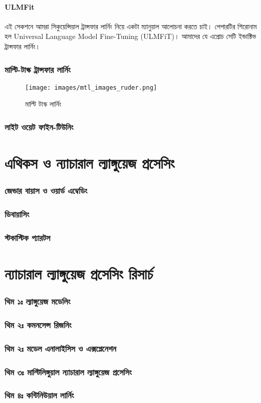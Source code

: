 \documentclass{book}
\begin{document}
\subsubsection{ULMFit} 
এই সেকশনে আমরা সিকুয়েন্সিয়াল ট্রান্সফার লার্নিং নিয়ে একটা ম্যানুয়াল আলোচনা করতে চাই। পেপারটির শিরোনাম হল Universal Language Model Fine-Tuning (ULMFiT)। আমাদের যে এপ্রোচ সেটি ইন্ডাক্টিভ ট্রান্সফার লার্নিং। 



\subsection{মাল্টি-টাস্ক ট্রান্সফার লার্নিং}

\begin{figure}[htbp] %
   \centering
   \texttt{[image: images/mtl\_images\_ruder.png]} 
   \caption{মাল্টি টাস্ক লার্নিং}
   \label{fig:ruder_mtl}
\end{figure} 
\subsection{লাইট ওয়েট ফাইন-টিউনিং}

\chapter{এথিকস ও ন্যাচারাল ল্যাঙ্গুয়েজ প্রসেসিং}
\subsection{জেন্ডার বায়াস ও ওয়ার্ড  এম্বেডিং}
\subsection{ডিবায়াসিং}
\subsection{স্টকাস্টিক প্যারটস}

\chapter{ন্যাচারাল ল্যাঙ্গুয়েজ প্রসেসিং রিসার্চ}
\subsection{থিম ১ঃ ল্যাঙ্গুয়েজ মডেলিং}
\subsection{থিম ২ঃ কমনসেন্স রিজনিং}
\subsection{থিম ২ঃ মডেল এনালাইসিস ও এক্সপ্লেনেশন}
\subsection{থিম ৩ঃ  মাল্টিলিঙ্গুয়াল ন্যাচারাল ল্যাঙ্গুয়েজ প্রসেসিং} 
\subsection{থিম ৪ঃ কন্টিনিউয়াল লার্নিং}




\end{document}
